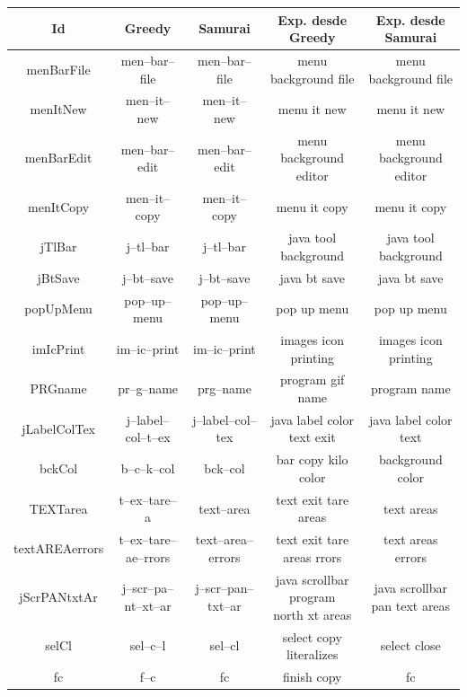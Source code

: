 \begin{table}

		\centering
   		\begin{tabular}{| c | c | c | c | c |}     
   		
       \hline
  	   \textbf{Id} & \textbf{Greedy} & \textbf{Samurai} & \textbf{Exp. desde Greedy} & \textbf{Exp. desde Samurai} \\ \hline

menBarFile&men--bar--file&men--bar--file&menu background file&menu background file\\ \hline
menItNew&men--it--new&men--it--new&menu it new&menu it new\\ \hline
menBarEdit&men--bar--edit&men--bar--edit&menu background editor&menu background editor\\ \hline
menItCopy&men--it--copy&men--it--copy&menu it copy&menu it copy\\ \hline
jTlBar&j--tl--bar&j--tl--bar&java tool background&java tool background\\ \hline
jBtSave&j--bt--save&j--bt--save&java bt save&java bt save\\ \hline
popUpMenu&pop--up--menu&pop--up--menu&pop up menu&pop up menu\\ \hline
imIcPrint&im--ic--print&im--ic--print&images icon printing&images icon printing\\ \hline
PRGname&pr--g--name&prg--name&program gif name&program name\\ \hline
jLabelColTex&j--label--col--t--ex&j--label--col--tex&java label color text exit&java label color text\\ \hline
bckCol&b--c--k--col&bck--col&bar copy kilo color&background color\\ \hline
TEXTarea&t--ex--tare--a&text--area&text exit tare areas&text areas\\ \hline
textAREAerrors&t--ex--tare--ae--rrors&text--area--errors&text exit tare areas rrors&text areas errors\\ \hline
jScrPANtxtAr&j--scr--pa--nt--xt--ar&j--scr--pan--txt--ar&\shortstack{java scrollbar program\\north xt areas}&\shortstack{java scrollbar\\pan text areas} \\ \hline
selCl&sel--c--l&sel--cl&select copy literalizes&select close\\ \hline
fc&f--c&fc&finish copy&fc\\ \hline

\end{tabular}
\end{table}
